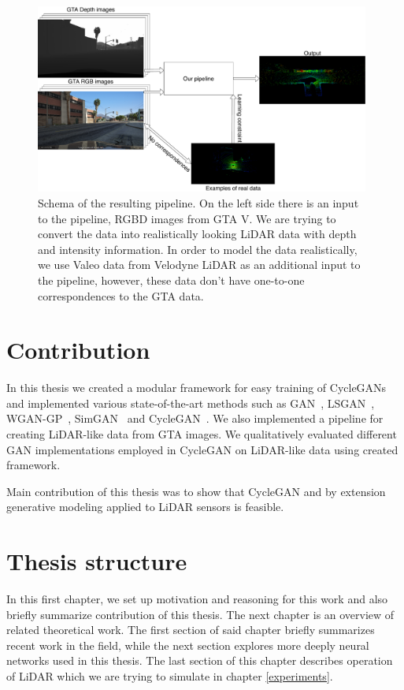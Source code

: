 \begin{figure}
\centering
\includegraphics[keepaspectratio, width=0.98\textwidth]{img/algorithm.pdf}
\caption[Schema of the resulting pipeline]{Schema of the resulting pipeline. On the left side there is an input to the pipeline, RGBD images from GTA V. We are trying to convert the data into realistically looking LiDAR data with depth and intensity information. In order to model the data realistically, we use Valeo data from Velodyne LiDAR as an additional input to the pipeline, however, these data don't have one-to-one correspondences to the GTA data.}
\label{schema}
\end{figure}

\section{Contribution}
In this thesis we created a modular framework for easy training of CycleGANs and implemented various state-of-the-art methods such as GAN~\cite{origgan}, LSGAN~\cite{lsgan}, WGAN-GP~\cite{wgan-gp}, SimGAN~\cite{historypool} and CycleGAN~\cite{cyclegan}. We also implemented a pipeline for creating LiDAR-like data from GTA images. We qualitatively evaluated different GAN implementations employed in CycleGAN on LiDAR-like data using created framework.

Main contribution of this thesis was to show that CycleGAN and by extension generative modeling applied to LiDAR sensors is feasible.

\section{Thesis structure}
In this first chapter, we set up motivation and reasoning for this work and also briefly summarize contribution of this thesis. The next chapter is an overview of related theoretical work. The first section of said chapter briefly summarizes recent work in the field, while the next section explores more deeply neural networks used in this thesis. The last section of this chapter describes operation of LiDAR which we are trying to simulate in chapter \ref{experiments}.

